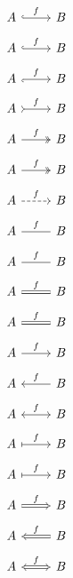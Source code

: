 \documentclass{article}
\begin{document}
\[\begin{tikzcd}A\arrow[r,hook,"f"] & B\end{tikzcd}\]
\[\begin{tikzcd}A\arrow[r,hookrightarrow,"f"] & B\end{tikzcd}\]
\[\begin{tikzcd}A\arrow[r,hook',"f"] & B\end{tikzcd}\]
\[\begin{tikzcd}A\arrow[r,tail,"f"] & B\end{tikzcd}\]
\[\begin{tikzcd}A\arrow[r,two heads,"f"] & B\end{tikzcd}\]
\[\begin{tikzcd}A\arrow[r,twoheadrightarrow,"f"] & B\end{tikzcd}\]
\[\begin{tikzcd}A\arrow[r,dashed,"f"] & B\end{tikzcd}\]
\[\begin{tikzcd}A\arrow[r,dash,"f"] & B\end{tikzcd}\]
\[\begin{tikzcd}A\arrow[r,no head,"f"] & B\end{tikzcd}\]
\[\begin{tikzcd}A\arrow[r,equal,"f"] & B\end{tikzcd}\]
\[\begin{tikzcd}A\arrow[r,equals,"f"] & B\end{tikzcd}\]
\[\begin{tikzcd}A\arrow[r,rightarrow,"f"] & B\end{tikzcd}\]
\[\begin{tikzcd}A\arrow[r,leftarrow,"f"] & B\end{tikzcd}\]
\[\begin{tikzcd}A\arrow[r,leftrightarrow,"f"] & B\end{tikzcd}\]
\[\begin{tikzcd}A\arrow[r,maps to,"f"] & B\end{tikzcd}\]
\[\begin{tikzcd}A\arrow[r,mapsto,"f"] & B\end{tikzcd}\]
\[\begin{tikzcd}A\arrow[r,Rightarrow,"f"] & B\end{tikzcd}\]
\[\begin{tikzcd}A\arrow[r,Leftarrow,"f"] & B\end{tikzcd}\]
\[\begin{tikzcd}A\arrow[r,Leftrightarrow,"f"] & B\end{tikzcd}\]
\end{document}
